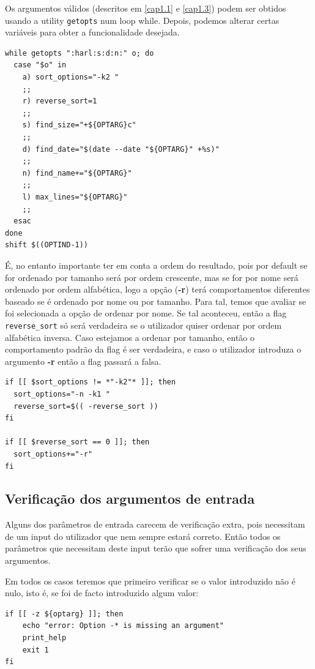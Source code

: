    Os argumentos válidos (descritos em \ref{cap1.1} e
   \ref{cap1.3}) podem ser obtidos usando a utility
   \verb|getopts| num loop while. Depois, podemos alterar
   certas variáveis para obter a funcionalidade desejada.

\begin{listing}[H]
\begin{verbatim}
while getopts ":harl:s:d:n:" o; do 
  case "$o" in
    a) sort_options="-k2 "
    ;;
    r) reverse_sort=1
    ;;
    s) find_size="+${OPTARG}c"
    ;;
    d) find_date="$(date --date "${OPTARG}" +%s)"
    ;;
    n) find_name+="${OPTARG}"
    ;;
    l) max_lines="${OPTARG}"
    ;;
  esac
done
shift $((OPTIND-1))
\end{verbatim}
\end{listing}

É, no entanto importante ter em conta a ordem do resultado,
pois por default se for ordenado por tamanho
será por ordem crescente, mas se for por nome será ordenado
por ordem alfabética, logo a opção (\textbf{-r}) terá
comportamentos diferentes baseado se é ordenado por nome ou
por tamanho.
Para tal, temos que avaliar se foi selecionada a opção de
ordenar por nome. Se tal aconteceu, então a flag
\verb|reverse_sort| só será verdadeira se o utilizador quiser
ordenar por ordem alfabética inversa. Caso estejamos a
ordenar por tamanho, então o comportamento padrão da flag é
ser verdadeira, e caso o utilizador introduza o argumento
\textbf{-r} então a flag passará a falsa.
\begin{listing}[H]
\begin{verbatim}
if [[ $sort_options != *"-k2"* ]]; then
  sort_options="-n -k1 "
  reverse_sort=$(( -reverse_sort ))
fi

if [[ $reverse_sort == 0 ]]; then
  sort_options+="-r"
fi
\end{verbatim}
\end{listing}

\subsection{Verificação dos argumentos de entrada}

Alguns dos parâmetros de entrada carecem de verificação extra,
pois necessitam de um input do utilizador que nem sempre estará
correto. Então todos os parâmetros que necessitam deste input
terão que sofrer uma verificação dos seus argumentos.


Em todos os casos teremos que primeiro verificar se o valor
introduzido não é nulo, isto é, se foi de facto introduzido
algum valor:
\begin{verbatim}
if [[ -z ${optarg} ]]; then
    echo "error: Option -* is missing an argument"
    print_help
    exit 1
fi
\end{verbatim}

